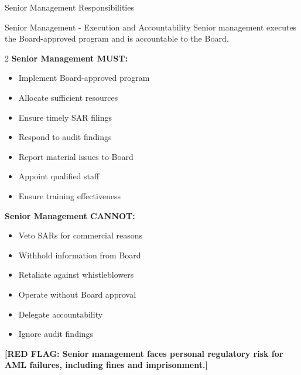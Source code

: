 \documentclass[11pt,a4paper]{beamer}
\newcommand{\redflag}[1]{\textcolor{red!80!black}{\textbf{[RED FLAG: #1]}}}
\begin{document}
	\begin{frame}{Senior Management Responsibilities}
		\begin{block}{Senior Management - Execution and Accountability}
			Senior management executes the Board-approved program and is accountable to the Board.
		\end{block}
		\begin{multicols}{2}
			\textbf{Senior Management MUST:}
			\begin{itemize}
				\item Implement Board-approved program
				\item Allocate sufficient resources
				\item Ensure timely SAR filings
				\item Respond to audit findings
				\item Report material issues to Board
				\item Appoint qualified staff
				\item Ensure training effectiveness
			\end{itemize}
			\columnbreak
			\textbf{Senior Management CANNOT:}
			\begin{itemize}
				\item Veto SARs for commercial reasons
				\item Withhold information from Board
				\item Retaliate against whistleblowers
				\item Operate without Board approval
				\item Delegate accountability
				\item Ignore audit findings
			\end{itemize}
		\end{multicols}
		\redflag{Senior management faces personal regulatory risk for AML failures, including fines and imprisonment.}
	\end{frame}
	
\end{document}
